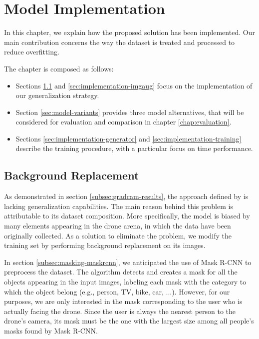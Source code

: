 \chapter{Model Implementation}
\label{chap:implementation}

In this chapter, we explain how the proposed solution has been implemented. Our main contribution concerns the way the dataset is treated and processed to reduce overfitting. 

The chapter is composed as follows:
\begin{itemize}
	\item Sections \ref{sec:implementation-bgreplace} and \ref{sec:implementation-imgaug} focus on the implementation of our generalization strategy.
	\item Section \ref{sec:model-variants} provides three model alternatives, that will be considered for evaluation and comparison in chapter \ref{chap:evaluation}.
	\item Sections \ref{sec:implementation-generator} and \ref{sec:implementation-training} describe the training procedure, with a particular focus on time performance.
\end{itemize}




\section{Background Replacement}
\label{sec:implementation-bgreplace}

As demonstrated in section \ref{subsec:gradcam-results}, the approach defined by \cite{mantegazza2019visionbased} is lacking generalization capabilities. The main reason behind this problem is attributable to its dataset composition. More specifically, the model is biased by many elements appearing in the drone arena, in which the data have been originally collected. As a solution to eliminate the problem, we modify the training set by performing background replacement on its images.

In section \ref{subsec:masking-maskrcnn}, we anticipated the use of Mask R-CNN to preprocess the dataset. The algorithm detects and creates a mask for all the objects appearing in the input images, labeling each mask with the category to which the object belong (e.g., person, TV, bike, car, ...). However, for our purposes, we are only interested in the mask corresponding to the user who is actually facing the drone. Since the user is always the nearest person to the drone's camera, its mask must be the one with the largest size among all people's masks found by Mask R-CNN.

